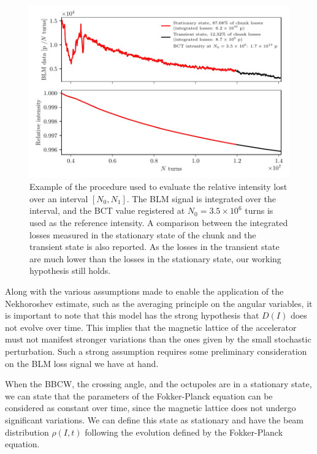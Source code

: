 \begin{figure}[hpt]
    \centering
    \includegraphics[width=1.0\textwidth]{5_wire_compensators_LHC/figs/stationary_transient_example_chunk.pdf}
    \caption{Example of the procedure used to evaluate the relative intensity lost over an interval $[N_0, N_1]$. The BLM signal is integrated over the interval, and the BCT value registered at $N_0=3.5\times10^6$ turns is used as the reference intensity. A comparison between the integrated losses measured in the stationary state of the chunk and the transient state is also reported. As the losses in the transient state are much lower than the losses in the stationary state, our working hypothesis still holds.}
    \label{fig:blm-to-intensity}
\end{figure}

Along with the various assumptions made to enable the application of the Nekhoroshev estimate, such as the averaging principle on the angular variables, it is important to note that this model has the strong hypothesis that $D(I)$ does not evolve over time. This implies that the magnetic lattice of the accelerator must not manifest stronger variations than the ones given by the small stochastic perturbation. Such a strong assumption requires some preliminary consideration on the BLM loss signal we have at hand.

When the BBCW, the crossing angle, and the octupoles are in a stationary state, we can state that the parameters of the Fokker-Planck equation can be considered as constant over time, since the magnetic lattice does not undergo significant variations. We can define this state as stationary and have the beam distribution $\rho(I, t)$ following the evolution defined by the Fokker-Planck equation.

